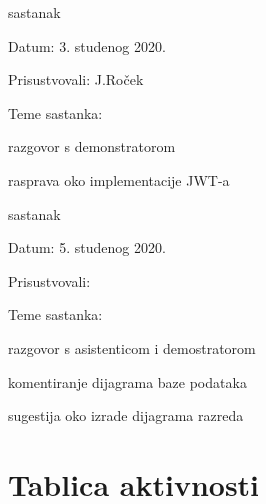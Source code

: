 \begin{packed_enum}
			\item  sastanak
		\item[] \begin{packed_item}
			\item Datum: 3. studenog 2020.
			\item Prisustvovali: J.Roček
			\item Teme sastanka:
			\begin{packed_item}
				\item razgovor s demonstratorom  
				\item rasprava oko implementacije JWT-a 
			\end{packed_item}
		\end{packed_item}
		
			\item  sastanak
		\item[] \begin{packed_item}
			\item Datum: 5. studenog 2020.
			\item Prisustvovali: 
			\item Teme sastanka:
			\begin{packed_item}
				\item razgovor s asistenticom i demostratorom
				\item komentiranje dijagrama baze podataka
				\item sugestija oko izrade dijagrama razreda
			\end{packed_item}
		\end{packed_item}
	\end{packed_enum}

		
		
		\eject
		\section*{Tablica aktivnosti}
		
			
					
						
			
